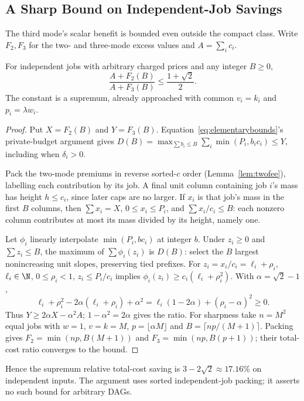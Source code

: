 \subsection{A Sharp Bound on Independent-Job Savings}

The third mode's scalar benefit is bounded even outside the compact class. Write $F_2,F_3$ for the two- and three-mode excess values and $A=\sum_i c_i$.
\begin{theorem}
\label{thm:ratio}
For independent jobs with arbitrary charged prices and any integer $B\ge0$,
\[
\frac{A+F_2(B)}{A+F_3(B)}\le\frac{1+\sqrt2}{2}.
\]
The constant is a supremum, already approached with common $v_i=k_i$ and $p_i=\lambda w_i$.
\end{theorem}
\begin{proof}
Put $X=F_2(B)$ and $Y=F_3(B)$. Equation~\eqref{eq:elementarybounds}'s private-budget argument gives $D(B)=\max_{\sum b_i\le B}\sum_i\min(P_i,b_ic_i)\le Y$, including when $\delta_i>0$.

Pack the two-mode premiums in reverse sorted-$c$ order (Lemma~\ref{lem:twofee}), labelling each contribution by its job. A final unit column containing job $i$'s mass has height $h\le c_i$, since later caps are no larger. If $x_i$ is that job's mass in the first $B$ columns, then $\sum x_i=X$, $0\le x_i\le P_i$, and $\sum x_i/c_i\le B$: each nonzero column contributes at most its mass divided by its height, namely one.

Let $\phi_i$ linearly interpolate $\min(P_i,bc_i)$ at integer $b$. Under $z_i\ge0$ and $\sum z_i\le B$, the maximum of $\sum\phi_i(z_i)$ is $D(B)$: select the $B$ largest nonincreasing unit slopes, preserving tied prefixes. For $z_i=x_i/c_i=\ell_i+\rho_i$, $\ell_i\in\N$, $0\le\rho_i<1$, $z_i\le P_i/c_i$ implies $\phi_i(z_i)\ge c_i(\ell_i+\rho_i^2)$. With $\alpha=\sqrt2-1$,
\[
 \ell_i+\rho_i^2-2\alpha(\ell_i+\rho_i)+\alpha^2
 =\ell_i(1-2\alpha)+(\rho_i-\alpha)^2\ge0.
\]
Thus $Y\ge2\alpha X-\alpha^2A$; $1-\alpha^2=2\alpha$ gives the ratio. For sharpness take $n=M^2$ equal jobs with $w=1$, $v=k=M$, $p=\lfloor\alpha M\rfloor$ and $B=\lceil np/(M+1)\rceil$. Packing gives $F_2=\min(np,B(M+1))$ and $F_3=\min(np,B(p+1))$; their total-cost ratio converges to the bound.
\end{proof}

Hence the supremum relative total-cost saving is $3-2\sqrt2\approx17.16\%$ on independent inputs. The argument uses sorted independent-job packing; it asserts no such bound for arbitrary DAGs.

